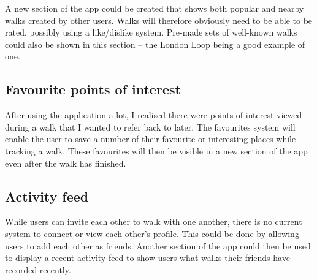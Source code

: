 A new section of the app could be created that shows both popular and nearby walks created by other users. Walks will therefore obviously need to be able to be rated, possibly using a like/dislike system. Pre-made sets of well-known walks could also be shown in this section -- the London Loop being a good example of one.

\subsection{Favourite points of interest}

After using the application a lot, I realised there were points of interest viewed during a walk that I wanted to refer back to later. The favourites system will enable the user to save a number of their favourite or interesting places while tracking a walk. These favourites will then be visible in a new section of the app even after the walk has finished.

\subsection{Activity feed}

While users can invite each other to walk with one another, there is no current system to connect or view each other's profile. This could be done by allowing users to add each other as friends. Another section of the app could then be used to display a recent activity feed to show users what walks their friends have recorded recently.



